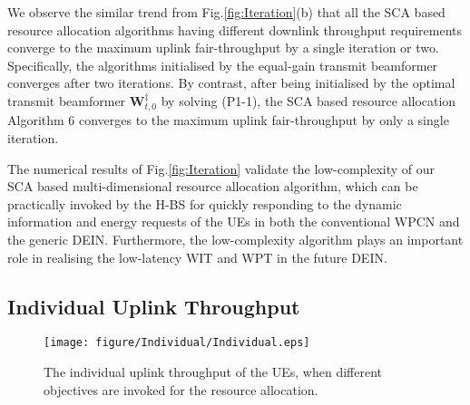 \documentclass[12pt,draft,onecolumn,journal]{IEEEtran}
\begin{document}
We observe the similar trend from Fig.\ref{fig:Iteration}(b) that all the SCA based resource allocation algorithms having different downlink throughput requirements converge to the maximum uplink fair-throughput by a single iteration or two. Specifically, the algorithms initialised by the equal-gain transmit beamformer converges after two iterations. By contrast, after being initialised by the optimal transmit beamformer $\mathbf{W}_{t,0}^{\ddagger}$ by solving (P1-1), the SCA based resource allocation Algorithm 6 converges to the maximum uplink fair-throughput by only a single iteration.

The numerical results of Fig.\ref{fig:Iteration} validate the low-complexity of our SCA based multi-dimensional resource allocation algorithm, which can be practically invoked by the H-BS for quickly responding to the dynamic information and energy requests of the UEs in  both the conventional WPCN and the generic DEIN. Furthermore, the low-complexity algorithm plays an important role in realising the low-latency WIT and WPT in the future DEIN.

\subsection{Individual Uplink Throughput}

\begin{figure}[!t]
\centering
\texttt{[image: figure/Individual/Individual.eps]}
\setlength{\abovecaptionskip}{0pt}
\setlength{\belowcaptionskip}{0pt}\caption{The individual uplink throughput of the UEs, when different objectives are invoked for the resource allocation.}
\label{fig:Individual}
\end{figure}
\end{document}
